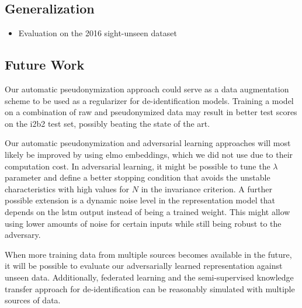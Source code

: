 \subsection{Generalization}

\begin{itemize}
    \item Evaluation on the 2016 sight-unseen dataset
\end{itemize}

\subsection{Future Work}
%
Our automatic pseudonymization approach could serve as a data augmentation scheme to be used as a regularizer for de-identification models.
%
Training a model on a combination of raw and pseudonymized data may result in better test scores on the i2b2 test set, possibly beating the state of the art.

%
Our automatic pseudonymization and adversarial learning approaches will most likely be improved by using \ac{elmo} embeddings, which we did not use due to their computation cost.
%
In adversarial learning, it might be possible to tune the $\lambda$ parameter and define a better stopping condition that avoids the unstable characteristics with high values for $N$ in the invariance criterion.
%
A further possible extension is a dynamic noise level in the representation model that depends on the \ac{lstm} output instead of being a trained weight.
%
This might allow using lower amounts of noise for certain inputs while still being robust to the adversary.

%
When more training data from multiple sources becomes available in the future, it will be possible to evaluate our adversarially learned representation against unseen data.
%
Additionally, federated learning and the semi-supervised knowledge transfer approach for de-identification can be reasonably simulated with multiple sources of data.


